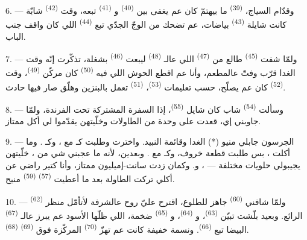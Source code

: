 \VUsaut{4.0mm}
\VUsaut{3.0mm}

6. --- وقدّام السياج،  \textsuperscript{(39)} ما
بيهتمّ كان عم يغفى بين  \textsuperscript{(40)}
و \textsuperscript{(41)} تبعه، وقت 
\textsuperscript{(42)} شابّة كانت شايلة  \textsuperscript{(43)}
بياضات، عم تضحك من الوجّ الجدّي تبع 
\textsuperscript{(44)} اللي كان واقف جنب الباب.

7. --- ولمّا شفت  \textsuperscript{(45)} طالع من
 \textsuperscript{(47)} اللي عالـ
\textsuperscript{(48)} ليبعت  \textsuperscript{(46)}
بشغلة، تذكّرت إنّه وقت الغدا قرّب وفتّ عالمطعم، وأنا عم اقطع الحوش
اللي فيه  \textsuperscript{(50)} كان مركّن 
\textsuperscript{(49)}، وقت  \textsuperscript{(52)} كان
عم يصلّح، حسب تعليمات  \textsuperscript{(53)}،
 \textsuperscript{(51)} تعمل بالبنزين وهلّق صار فيها
حادث.

8. --- وسألت  \textsuperscript{(54)} شاب كان شايل
 \textsuperscript{(55)}، إذا السفرة المشتركة تحت
الفرندة، ولمّا جاوبني إي، قعدت على وحدة من الطاولات وخلّيتهن يقدّموا
لي أكل ممتاز.


\VUsaut{4.0mm}
\VUsaut{3.0mm}

9. --- الجرسون جابلي منيو (*) الغدا وقائمة النبيد. واخترت وطلبت
كـ مع ، وكـ
. وما أكلت ، بس طلبت قطعة
 خروف، وكـ  مع
. وبعدين، لأنه ما عجبني شي من ، خلّيتهن يجيبولي حلويات مختلفة — ،
 و. وكمان زدت  سانت-إميليون
ممتاز، وأنا كتير راضي عن أكلي تركت الطاولة بعد ما أعطيت
 \textsuperscript{(57)} 
\textsuperscript{(59)} منيح.

10. --- ولمّا شافني  \textsuperscript{(60)} جاهز
للطلوع، اقترح عليّ روح عالشرفة لأتأمّل منظر 
\textsuperscript{(62)} الرائع. وبعيد بلّشت تبيّن 
\textsuperscript{(63)}، و \textsuperscript{(64)}،
و \textsuperscript{(65)} ضخمة، اللي ظلّها الأسود عم
يبرز عالـ \textsuperscript{(67)} البيضا تبع 
\textsuperscript{(66)}. ونسمة خفيفة كانت عم تهزّ 
\textsuperscript{(70)} المركّزة فوق  \textsuperscript{(69)}
 \textsuperscript{(68)}.

